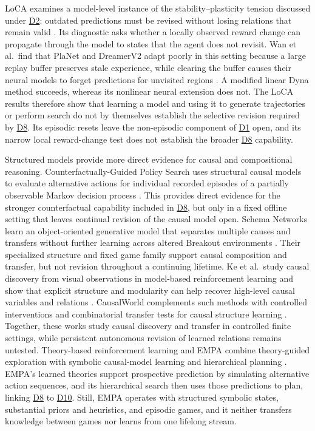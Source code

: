 \documentclass[10pt,journal,compsoc]{IEEEtran}
\DeclareRobustCommand{\Dref}[1]{\hyperref[sec:d#1]{D#1}}
\begin{document}
LoCA examines a model-level instance of the stability--plasticity tension discussed under \Dref{2}: outdated predictions must be revised without losing relations that remain valid \cite{wan2022}.
Its diagnostic asks whether a locally observed reward change can propagate through the model to states that the agent does not revisit.
Wan et al.\ find that PlaNet and DreamerV2 adapt poorly in this setting because a large replay buffer preserves stale experience, while clearing the buffer causes their neural models to forget predictions for unvisited regions \cite{wan2022}.
A modified linear Dyna method succeeds, whereas its nonlinear neural extension does not.
The LoCA results therefore show that learning a model and using it to generate trajectories or perform search do not by themselves establish the selective revision required by \Dref{8}.
Its episodic resets leave the non-episodic component of \Dref{1} open, and its narrow local reward-change test does not establish the broader \Dref{8} capability.

Structured models provide more direct evidence for causal and compositional reasoning.
Counterfactually-Guided Policy Search uses structural causal models to evaluate alternative actions for individual recorded episodes of a partially observable Markov decision process \cite{buesing2019}.
This provides direct evidence for the stronger counterfactual capability included in \Dref{8}, but only in a fixed offline setting that leaves continual revision of the causal model open.
Schema Networks learn an object-oriented generative model that separates multiple causes and transfers without further learning across altered Breakout environments \cite{kansky2017}.
Their specialized structure and fixed game family support causal composition and transfer, but not revision throughout a continuing lifetime.
Ke et al.\ study causal discovery from visual observations in model-based reinforcement learning and show that explicit structure and modularity can help recover high-level causal variables and relations \cite{ke2021}.
CausalWorld complements such methods with controlled interventions and combinatorial transfer tests for causal structure learning \cite{ahmed2021}.
Together, these works study causal discovery and transfer in controlled finite settings, while persistent autonomous revision of learned relations remains untested.
Theory-based reinforcement learning and EMPA combine theory-guided exploration with symbolic causal-model learning and hierarchical planning \cite{tsividis2026}.
EMPA's learned theories support prospective prediction by simulating alternative action sequences, and its hierarchical search then uses those predictions to plan, linking \Dref{8} to \Dref{10}.
Still, EMPA operates with structured symbolic states, substantial priors and heuristics, and episodic games, and it neither transfers knowledge between games nor learns from one lifelong stream.
\end{document}
